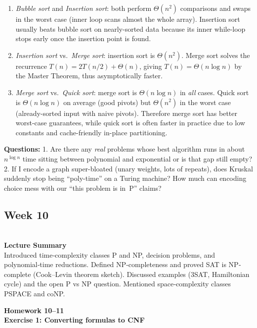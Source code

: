 \documentclass{article}
\theoremstyle{theorem}
\theoremstyle{definition}
\theoremstyle{remark}
\begin{document}
\begin{enumerate}
  \item \emph{Bubble sort} and \emph{Insertion sort}:  
        both perform $\Theta(n^{2})$ comparisons and swaps in the worst case  
        (inner loop scans almost the whole array).  
        Insertion sort usually beats bubble sort on nearly-sorted data because
        its inner while-loop stops early once the insertion point is found.

  \item \emph{Insertion sort} vs.\ \emph{Merge sort}:  
        insertion sort is $\Theta(n^{2})$.  
        Merge sort solves the recurrence $T(n)=2T(n/2)+\Theta(n)$,  
        giving $T(n)=\Theta(n\log n)$ by the Master Theorem, thus asymptotically faster.

  \item \emph{Merge sort} vs.\ \emph{Quick sort}:  
        merge sort is $\Theta(n\log n)$ in \emph{all} cases.  
        Quick sort is $\Theta(n\log n)$ on average (good pivots) but  
        $\Theta(n^{2})$ in the worst case (already-sorted input with naive pivots).  
        Therefore merge sort has better worst-case guarantees,  
        while quick sort is often faster in practice due to low constants  
        and cache-friendly in-place partitioning.
\end{enumerate}
\textbf{Questions: } 1. Are there any \emph{real} problems whose best algorithm runs in about $n^{\log n}$ time sitting between polynomial and exponential or is that gap still empty?  2. If I encode a graph super-bloated (unary weights, lots of repeats), does Kruskal suddenly stop being ``poly-time'' on a Turing machine? How much can encoding choice mess with our ``this problem is in~P'' claims?

\subsection{Week 10}\\
\textbf{Lecture Summary}\\
Introduced time‐complexity classes P and NP, decision problems, and polynomial‐time reductions.  Defined NP‐completeness and proved SAT is NP‐complete (Cook–Levin theorem sketch).  Discussed examples (3SAT, Hamiltonian cycle) and the open P vs NP question.  Mentioned space‐complexity classes PSPACE and coNP.

\textbf{Homework 10--11}\\
\textbf{Exercise 1: Converting formulas to CNF}
\end{document}
